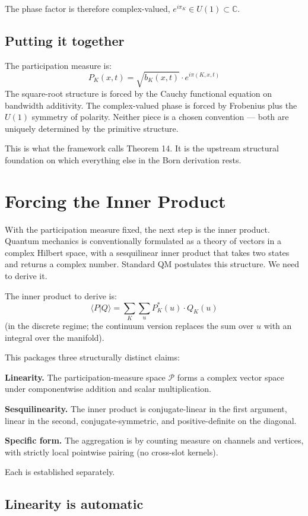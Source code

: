 \documentclass[11pt,a4paper]{article}
\begin{document}
The phase factor is therefore complex-valued, $e^{i\pi_K} \in U(1) \subset \mathbb{C}$.

\subsection{Putting it together}

The participation measure is:
\[
P_K(x, t) = \sqrt{b_K(x, t)} \cdot e^{i\pi(K, x, t)}
\]
The square-root structure is forced by the Cauchy functional equation on bandwidth additivity. The complex-valued phase is forced by Frobenius plus the $U(1)$ symmetry of polarity. Neither piece is a chosen convention --- both are uniquely determined by the primitive structure.

This is what the framework calls Theorem 14. It is the upstream structural foundation on which everything else in the Born derivation rests.

\section{Forcing the Inner Product}

With the participation measure fixed, the next step is the inner product. Quantum mechanics is conventionally formulated as a theory of vectors in a complex Hilbert space, with a sesquilinear inner product that takes two states and returns a complex number. Standard QM postulates this structure. We need to derive it.

The inner product to derive is:
\[
\langle P | Q\rangle = \sum_K \sum_u P^*_K(u) \cdot Q_K(u)
\]
(in the discrete regime; the continuum version replaces the sum over $u$ with an integral over the manifold).

This packages three structurally distinct claims:

\textbf{Linearity.} The participation-measure space $\mathcal{P}$ forms a complex vector space under componentwise addition and scalar multiplication.

\textbf{Sesquilinearity.} The inner product is conjugate-linear in the first argument, linear in the second, conjugate-symmetric, and positive-definite on the diagonal.

\textbf{Specific form.} The aggregation is by counting measure on channels and vertices, with strictly local pointwise pairing (no cross-slot kernels).

Each is established separately.

\subsection{Linearity is automatic}
\end{document}
